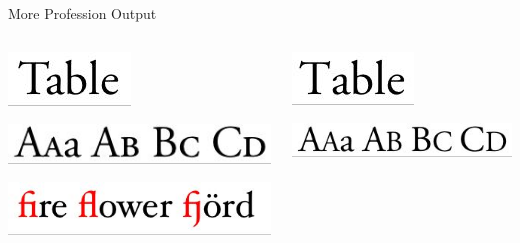 \documentclass[final,aspectratio=43]{beamer}
\begin{document}
\begin{frame}{More Profession Output}
    \begin{columns}
        \begin{column}{0.5\linewidth}
            \begin{center}
            
            \includegraphics[width=0.4\linewidth]{figures/kerning_latex}
            
            \includegraphics[width=\linewidth]{figures/sc_latex}
            
            \includegraphics[width=\linewidth]{figures/ligatures_latex}
            
            \end{center}
        \end{column}%
        \begin{column}{0.5\linewidth}
            \begin{center}
            
            \includegraphics[width=0.4\linewidth]{figures/kerning_word}
            
            \includegraphics[width=\linewidth]{figures/sc_word}
            

\end{center}
\end{column}
\end{columns}
\end{frame}
\end{document}
